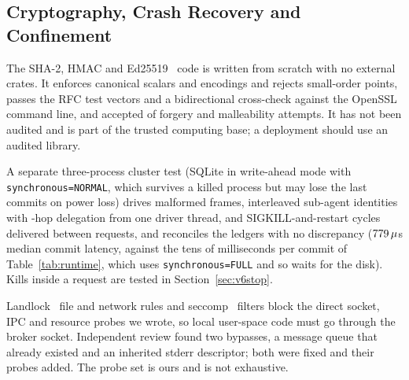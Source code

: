 \subsection{Cryptography, Crash Recovery and Confinement}

 The SHA-2, HMAC and Ed25519~\cite{bernstein2012ed25519} code is written from scratch with no
external crates. It enforces canonical scalars and encodings and rejects small-order points, passes the RFC test
vectors and a bidirectional cross-check against the OpenSSL command line, and accepted \VFourCryptoFalseAccepts{} of
\VFourCryptoAttacks{} forgery and malleability attempts. It has not been audited and is part of the trusted computing
base; a deployment should use an audited library.

 A separate three-process cluster test (SQLite in write-ahead mode with
\texttt{synchronous=NORMAL}, which survives a killed process but may lose the last commits on power loss) drives
\VFiveClusterFuzzFrames{} malformed frames, \VFiveClusterSubagents{} interleaved sub-agent identities with
\VFiveClusterHops-hop delegation from one driver thread, and \VFiveClusterSigkillCycles{} SIGKILL-and-restart cycles
delivered between requests, and reconciles the ledgers with no discrepancy (\(779\,\mu\)s median
commit latency, against the tens of milliseconds per commit of Table~\ref{tab:runtime}, which uses
\texttt{synchronous=FULL} and so waits for the disk). Kills inside a request are tested in Section~\ref{sec:v6stop}.

 Landlock~\cite{landlock} file and network rules and seccomp~\cite{seccomp} filters block the
\VTwoProbes{} direct socket, IPC and resource probes we wrote, so local user-space code must go through the broker
socket. Independent review found two bypasses, a message queue that already existed and an inherited stderr
descriptor; both were fixed and their probes added. The probe set is ours and is not exhaustive.
